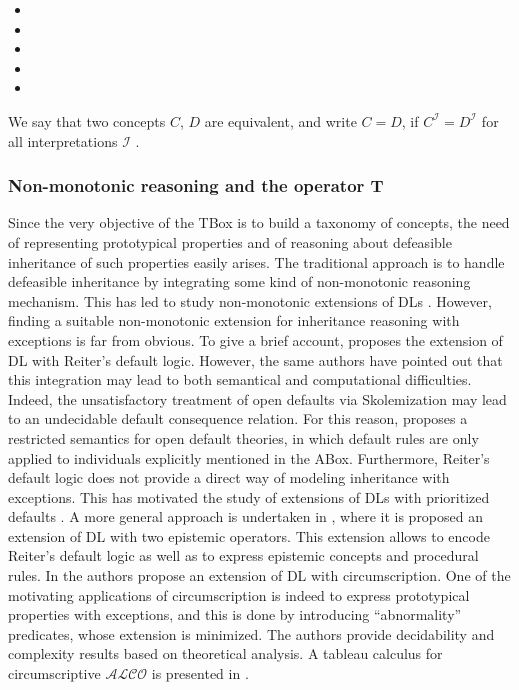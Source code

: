 \documentclass[a4paper, 11pt, oneside]{elsarticle}
\newcommand{\itab}[1]{\hspace{0em}\rlap{#1}}
\newcommand{\tip}{{\bf T}}
\newcommand{\vero} {\top}
\newcommand{\tc} {\mid}
\newcommand{\imp} {\rightarrow}
\newcommand{\mint}{\sqcap}
\newcommand{\perogni} {\forall}
\newcommand{\esiste} {\exists}
\newcommand{\II} {\mathcal{I}}
\begin{document}
\begin{itemize}
\item[] \itab{$\vero^{\II} = \Delta^{\II}$}
\item[] \itab{$(\neg A)^{\II} = \Delta^{\II} $\textbackslash $A^{\II}$}
\item[] \itab{$(C \mint D)^{\II} = C^{\II} \mint D^{\II}$}
\item[] \itab{$(\forall R.C)^{\II} = \left\{x \in \Delta \tc \perogni y.(x, y)\in R^{\II} \imp y \in C^{\II} \right\}$}
\item[] \itab{$(\exists R.\vero)^{\II} = \left\{x \in \Delta \tc \esiste y.(x, y)\in R^{\II} \right\}$}
\end{itemize}

We say that two concepts $C$, $D$ are equivalent, and write $C = D$, if $C^{\II} = D^{\II}$ for all interpretations $\II$
\cite{Baader:2003:BDL:885746.885749}.



\subsubsection{Non-monotonic reasoning and the operator \tip}
Since the very objective of the TBox is to build a taxonomy of concepts, the need of representing prototypical properties and of reasoning about defeasible inheritance of such properties easily arises.
The traditional approach is to handle defeasible inheritance by integrating some kind of non-monotonic reasoning mechanism.
This has led to study non-monotonic extensions of DLs \cite{baader95a, baader95b, bonattilutzwolterkr06, casinistraccia2010, donini98, donini2002, eiter2004, straccia93}.
However, finding a suitable non-monotonic extension for inheritance reasoning with exceptions is far from obvious.
To give a brief account, \cite{baader95a} proposes the extension of DL with Reiter's default logic.
However, the same authors have pointed out that this integration may lead to both semantical and computational difficulties.
Indeed, the unsatisfactory treatment of open defaults via Skolemization may lead to an undecidable default consequence relation. For this reason, \cite{baader95a} proposes a restricted semantics for open default theories, in which default rules are only applied to individuals explicitly mentioned in the ABox.
Furthermore, Reiter's default logic does not provide a direct way of modeling inheritance with exceptions.
This has motivated the study of extensions of DLs with prioritized defaults
\cite{straccia93,baader95b}.
A more general approach is undertaken in \cite{donini2002}, where it is proposed an extension of DL with two epistemic operators. This extension allows to encode Reiter's default logic as well as to express epistemic concepts and procedural rules.
In \cite{bonattilutz} the authors propose an extension of DL with circumscription. One of the motivating applications of circumscription is indeed to express prototypical properties with exceptions, and this is done by introducing ``abnormality'' predicates, whose extension is minimized.
The authors provide decidability and complexity results based on theoretical analysis.
A tableau calculus for circumscriptive $\mathcal{ALCO}$ is presented in \cite{hitzlertableau}.
\end{document}
